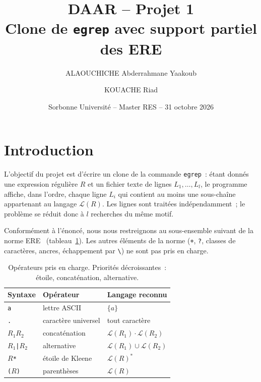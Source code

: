 \documentclass[11pt,a4paper]{article}
\title{DAAR -- Projet 1\texorpdfstring{\\[0.3em]}{ : }
\large Clone de \texttt{egrep} avec support partiel des ERE}
\author{ALAOUCHICHE Abderrahmane Yaakoub \and KOUACHE Riad}
\date{Sorbonne Université -- Master RES -- 31 octobre 2026}
\begin{document}
\maketitle
\tableofcontents

\section{Introduction}

L'objectif du projet est d'écrire un clone de la commande \texttt{egrep}~:
étant donnés une expression régulière $R$ et un fichier texte de lignes
$L_1,\dots,L_l$, le programme affiche, dans l'ordre, chaque ligne $L_i$ qui
contient au moins une sous-chaîne appartenant au langage $\mathcal{L}(R)$.
Les lignes sont traitées indépendamment~; le problème se réduit donc à $l$
recherches du même motif.

Conformément à l'énoncé, nous nous restreignons au sous-ensemble suivant de la
norme ERE~\cite{OpenGroupERE} (tableau~\ref{tab:operateurs}). Les autres
éléments de la norme (\texttt{+}, \texttt{?}, classes de caractères, ancres,
échappement par \texttt{\textbackslash}) ne sont pas pris en charge.

\begin{table}[ht]
\centering
\begin{tabular}{lll}
\toprule
\textbf{Syntaxe} & \textbf{Opérateur} & \textbf{Langage reconnu} \\
\midrule
\texttt{a} & lettre ASCII & $\{a\}$ \\
\texttt{.} & caractère universel & tout caractère \\
$R_1R_2$ & concaténation & $\mathcal{L}(R_1)\cdot\mathcal{L}(R_2)$ \\
$R_1$\texttt{|}$R_2$ & alternative & $\mathcal{L}(R_1)\cup\mathcal{L}(R_2)$ \\
$R$\texttt{*} & étoile de Kleene & $\mathcal{L}(R)^*$ \\
\texttt{(}$R$\texttt{)} & parenthèses & $\mathcal{L}(R)$ \\
\bottomrule
\end{tabular}
\caption{Opérateurs pris en charge. Priorités décroissantes~: étoile, concaténation, alternative.}
\label{tab:operateurs}
\end{table}
\end{document}
